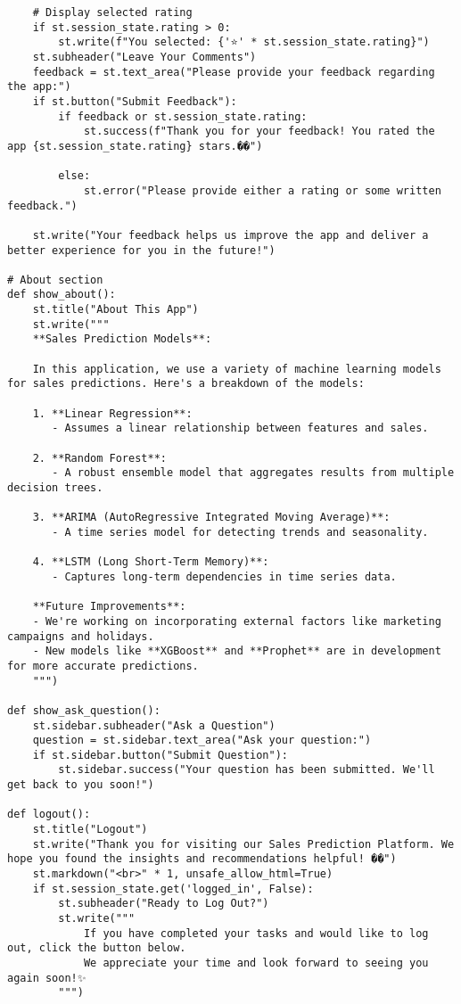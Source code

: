 \documentclass[10pt]{report}
\begin{document}
\begin{center}
\begin{lstlisting}
    # Display selected rating
    if st.session_state.rating > 0:
        st.write(f"You selected: {'⭐' * st.session_state.rating}")
    st.subheader("Leave Your Comments")
    feedback = st.text_area("Please provide your feedback regarding the app:")
    if st.button("Submit Feedback"):
        if feedback or st.session_state.rating:
            st.success(f"Thank you for your feedback! You rated the app {st.session_state.rating} stars.��")
        
        else:
            st.error("Please provide either a rating or some written feedback.")
    
    st.write("Your feedback helps us improve the app and deliver a better experience for you in the future!")

# About section
def show_about():
    st.title("About This App")
    st.write("""
    **Sales Prediction Models**:
    
    In this application, we use a variety of machine learning models for sales predictions. Here's a breakdown of the models:
    
    1. **Linear Regression**:
       - Assumes a linear relationship between features and sales.
    
    2. **Random Forest**:
       - A robust ensemble model that aggregates results from multiple decision trees.
    
    3. **ARIMA (AutoRegressive Integrated Moving Average)**:
       - A time series model for detecting trends and seasonality.

    4. **LSTM (Long Short-Term Memory)**:
       - Captures long-term dependencies in time series data.
       
    **Future Improvements**:
    - We're working on incorporating external factors like marketing campaigns and holidays.
    - New models like **XGBoost** and **Prophet** are in development for more accurate predictions.
    """)

def show_ask_question():
    st.sidebar.subheader("Ask a Question")
    question = st.sidebar.text_area("Ask your question:")
    if st.sidebar.button("Submit Question"):
        st.sidebar.success("Your question has been submitted. We'll get back to you soon!")

def logout():
    st.title("Logout")
    st.write("Thank you for visiting our Sales Prediction Platform. We hope you found the insights and recommendations helpful! ��")
    st.markdown("<br>" * 1, unsafe_allow_html=True)
    if st.session_state.get('logged_in', False):
        st.subheader("Ready to Log Out?")
        st.write("""
            If you have completed your tasks and would like to log out, click the button below. 
            We appreciate your time and look forward to seeing you again soon!✨
        """)


\end{lstlisting}
\end{center}
\end{document}
